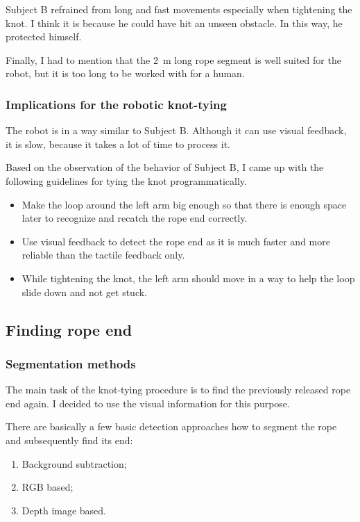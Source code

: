             Subject B refrained from long and fast movements especially when tightening the knot. I think it is because he could have hit an unseen obstacle. In this way, he protected himself.

            Finally, I had to mention that the \SI{2}{m} long rope segment is well suited for the \CloPeMa\/ robot, but it is too long to be worked with for a human.


        \subsubsection{Implications for the robotic knot-tying}
            The \CloPeMa\/ robot is in a way similar to Subject B. Although it can use visual feedback, it is slow, because it takes a lot of time to process it.

            Based on the observation of the behavior of Subject B, I came up with the following guidelines for tying the knot programmatically.
%
            \begin{itemize}
                \item Make the loop around the left arm big enough so that there is enough space later to recognize and recatch the rope end correctly.

                \item Use visual feedback to detect the rope end as it is much faster and more reliable than the tactile feedback only.

                \item While tightening the knot, the left arm should move in a way to help the loop slide down and not get stuck.

            \end{itemize}

    \subsection{Finding rope end}

        \subsubsection{Segmentation methods}

            The main task of the knot-tying procedure is to find the previously released rope end again. I decided to use the visual information for this purpose.

            There are basically a few basic detection approaches how to segment the rope and subsequently find its end:
%
            \begin{enumerate}\itemsep0pt
                \item Background subtraction; \label{it: background subtraction}
                \item RGB based; \label{it: rgb}
                \item Depth image based. \label{it: depth}
            \end{enumerate}

